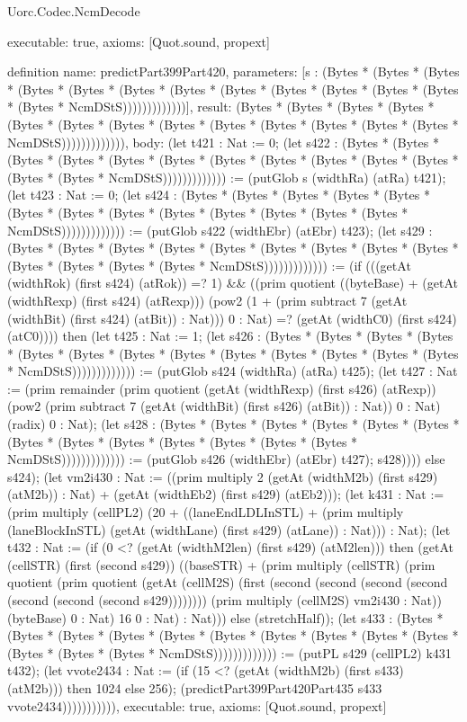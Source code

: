 \begin{lexlean}{Uorc.Codec.NcmDecode}
\begin{semanticmodule}
{  executable: true,
  axioms: [Quot.sound, propext]
}

definition{
  name: predictPart399Part420,
  parameters: [s : (Bytes * (Bytes * (Bytes * (Bytes * (Bytes * (Bytes * (Bytes * (Bytes * (Bytes * (Bytes * (Bytes * (Bytes * (Bytes * NcmDStS)))))))))))))],
  result: (Bytes * (Bytes * (Bytes * (Bytes * (Bytes * (Bytes * (Bytes * (Bytes * (Bytes * (Bytes * (Bytes * (Bytes * (Bytes * NcmDStS))))))))))))),
  body: (let t421 : Nat := 0; (let s422 : (Bytes * (Bytes * (Bytes * (Bytes * (Bytes * (Bytes * (Bytes * (Bytes * (Bytes * (Bytes * (Bytes * (Bytes * (Bytes * NcmDStS))))))))))))) := (putGlob s (widthRa) (atRa) t421); (let t423 : Nat := 0; (let s424 : (Bytes * (Bytes * (Bytes * (Bytes * (Bytes * (Bytes * (Bytes * (Bytes * (Bytes * (Bytes * (Bytes * (Bytes * (Bytes * NcmDStS))))))))))))) := (putGlob s422 (widthEbr) (atEbr) t423); (let s429 : (Bytes * (Bytes * (Bytes * (Bytes * (Bytes * (Bytes * (Bytes * (Bytes * (Bytes * (Bytes * (Bytes * (Bytes * (Bytes * NcmDStS))))))))))))) := (if (((getAt (widthRok) (first s424) (atRok)) =? 1) && ((prim quotient ((byteBase) + (getAt (widthRexp) (first s424) (atRexp))) (pow2 (1 + (prim subtract 7 (getAt (widthBit) (first s424) (atBit)) : Nat))) 0 : Nat) =? (getAt (widthC0) (first s424) (atC0)))) then (let t425 : Nat := 1; (let s426 : (Bytes * (Bytes * (Bytes * (Bytes * (Bytes * (Bytes * (Bytes * (Bytes * (Bytes * (Bytes * (Bytes * (Bytes * (Bytes * NcmDStS))))))))))))) := (putGlob s424 (widthRa) (atRa) t425); (let t427 : Nat := (prim remainder (prim quotient (getAt (widthRexp) (first s426) (atRexp)) (pow2 (prim subtract 7 (getAt (widthBit) (first s426) (atBit)) : Nat)) 0 : Nat) (radix) 0 : Nat); (let s428 : (Bytes * (Bytes * (Bytes * (Bytes * (Bytes * (Bytes * (Bytes * (Bytes * (Bytes * (Bytes * (Bytes * (Bytes * (Bytes * NcmDStS))))))))))))) := (putGlob s426 (widthEbr) (atEbr) t427); s428)))) else s424); (let vm2i430 : Nat := ((prim multiply 2 (getAt (widthM2b) (first s429) (atM2b)) : Nat) + (getAt (widthEb2) (first s429) (atEb2))); (let k431 : Nat := (prim multiply (cellPL2) (20 + ((laneEndLDLInSTL) + (prim multiply (laneBlockInSTL) (getAt (widthLane) (first s429) (atLane)) : Nat))) : Nat); (let t432 : Nat := (if (0 <? (getAt (widthM2len) (first s429) (atM2len))) then (getAt (cellSTR) (first (second s429)) ((baseSTR) + (prim multiply (cellSTR) (prim quotient (prim quotient (getAt (cellM2S) (first (second (second (second (second (second (second (second s429)))))))) (prim multiply (cellM2S) vm2i430 : Nat)) (byteBase) 0 : Nat) 16 0 : Nat) : Nat))) else (stretchHalf)); (let s433 : (Bytes * (Bytes * (Bytes * (Bytes * (Bytes * (Bytes * (Bytes * (Bytes * (Bytes * (Bytes * (Bytes * (Bytes * (Bytes * NcmDStS))))))))))))) := (putPL s429 (cellPL2) k431 t432); (let vvote2434 : Nat := (if (15 <? (getAt (widthM2b) (first s433) (atM2b))) then 1024 else 256); (predictPart399Part420Part435 s433 vvote2434))))))))))),
  executable: true,
  axioms: [Quot.sound, propext]
}


\end{semanticmodule}
\end{lexlean}
